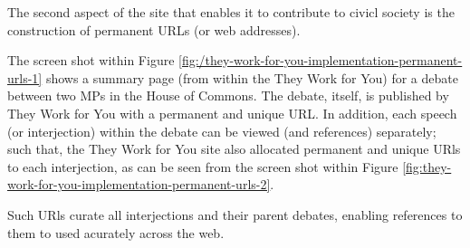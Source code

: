 The second aspect of the site that enables it to contribute to civicl society 
is the construction of permanent URLs (or web addresses).

The screen shot within Figure \ref{fig:/they-work-for-you-implementation-permanent-urls-1} shows a summary page (from within the They Work for You) for a debate between two MPs in the House of Commons. 
The debate, itself, is published by They Work for You with a permanent and unique URL.
In addition, each speech (or interjection) within the debate can be viewed (and references) separately; such that, the They Work for You site also allocated permanent and unique URls to each interjection, as can be seen from the screen shot within Figure \ref{fig:they-work-for-you-implementation-permanent-urls-2}.

Such URls curate all interjections and their parent debates, enabling references to them to used acurately across the web.
